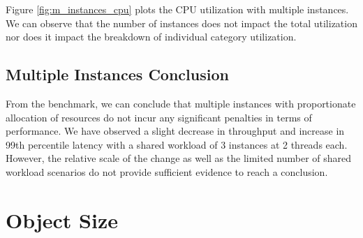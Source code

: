 Figure \ref{fig:m_instances_cpu} plots the CPU utilization with multiple instances. We can observe that the number of instances does not impact the total utilization nor does it impact the breakdown of individual category utilization.

\subsection{Multiple Instances Conclusion}
From the benchmark, we can conclude that multiple instances with proportionate allocation of resources do not incur any significant penalties in terms of performance. We have observed a slight decrease in throughput and increase in 99th percentile latency with a shared workload of 3 instances at 2 threads each. However, the relative scale of the change as well as the limited number of shared workload scenarios do not provide sufficient evidence to reach a conclusion.


\section{Object Size}
